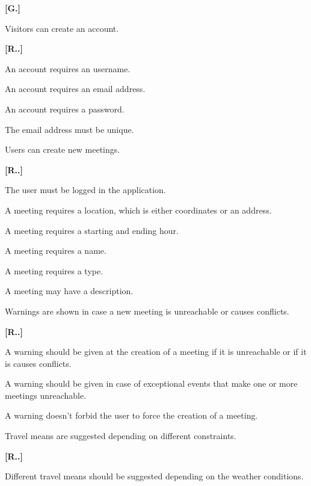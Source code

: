 \begin{list}
{\bfseries{}[G.]~}
{
}
\item Visitors can create an account.
\begin{list}
	{\bfseries{}[R..]~}
	{
	}
\item An account requires an username.
\item An account requires an email address.
\item An account requires a password.
\item The email address must be unique.
\end{list}
\item Users can create new meetings.
\begin{list}
	{\bfseries{}[R..]~}
	{
	}
	\item The user must be logged in the application.
\item A meeting requires a location, which is either coordinates or an address.
\item A meeting requires a starting and ending hour.
\item A meeting requires a name.
\item A meeting requires a type.
\item A meeting may have a description.
\end{list}
\item Warnings are shown in case a new meeting is unreachable or causes conflicts.
\begin{list}
	{\bfseries{}[R..]~}
	{
	}
\item A warning should be given at the creation of a meeting if it is unreachable or if it is causes conflicts.
\item A warning should be given in case of exceptional events that make one or more meetings unreachable.
\item A warning doesn’t forbid the user to force the creation of a meeting.
\end{list}
\item Travel means are suggested depending on different constraints.
\begin{list}
	{\bfseries{}[R..]~}
	{
	}
\item Different travel means should be suggested depending on the weather conditions.

\end{list}
\end{list}
